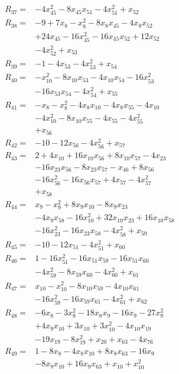 \begin{align*}
R_{37}={}&-4x_{45}^{2} -8x_{45}x_{51} -4x_{51}^{2} +x_{52}\\[3pt]
R_{38}={}&-9 +7x_{8} -x_{8}^{2} -8x_{8}x_{45} -4x_{8}x_{52}\\
&+24x_{45} -16x_{45}^{2} -16x_{45}x_{52} +12x_{52}\\
&-4x_{52}^{2} +x_{53}\\[3pt]
R_{39}={}&-1 -4x_{53} -4x_{53}^{2} +x_{54}\\[3pt]
R_{40}={}&-x_{10}^{2} -8x_{10}x_{53} -4x_{10}x_{54} -16x_{53}^{2}\\
&-16x_{53}x_{54} -4x_{54}^{2} +x_{55}\\[3pt]
R_{41}={}&-x_{8} -x_{8}^{2} -4x_{8}x_{10} -4x_{8}x_{55} -4x_{10}\\
&-4x_{10}^{2} -8x_{10}x_{55} -4x_{55} -4x_{55}^{2}\\
&+x_{56}\\[3pt]
R_{42}={}&-10 -12x_{56} -4x_{56}^{2} +x_{57}\\[3pt]
R_{43}={}&2 +4x_{10} +16x_{10}x_{56} +8x_{10}x_{57} -4x_{23}\\
&-16x_{23}x_{56} -8x_{23}x_{57} -x_{46} +8x_{56}\\
&-16x_{56}^{2} -16x_{56}x_{57} +4x_{57} -4x_{57}^{2}\\
&+x_{58}\\[3pt]
R_{44}={}&x_{9} -x_{9}^{2} +8x_{9}x_{10} -8x_{9}x_{23}\\
&-4x_{9}x_{58} -16x_{10}^{2} +32x_{10}x_{23} +16x_{10}x_{58}\\
&-16x_{23}^{2} -16x_{23}x_{58} -4x_{58}^{2} +x_{59}\\[3pt]
R_{45}={}&-10 -12x_{51} -4x_{51}^{2} +x_{60}\\[3pt]
R_{46}={}&1 -16x_{51}^{2} -16x_{51}x_{59} -16x_{51}x_{60}\\
&-4x_{59}^{2} -8x_{59}x_{60} -4x_{60}^{2} +x_{61}\\[3pt]
R_{47}={}&x_{10} -x_{10}^{2} -8x_{10}x_{59} -4x_{10}x_{61}\\
&-16x_{59}^{2} -16x_{59}x_{61} -4x_{61}^{2} +x_{62}\\[3pt]
R_{48}={}&-6x_{8} -3x_{8}^{2} -18x_{8}x_{9} -16x_{9} -27x_{9}^{2}\\
&+4x_{9}x_{10} +3x_{10} +3x_{10}^{2} -4x_{10}x_{19}\\
&-19x_{19} -8x_{19}^{2} +x_{20} +x_{63} -4x_{76}\\[3pt]
R_{49}={}&1 -8x_{8} -4x_{8}x_{10} +8x_{8}x_{63} -16x_{9}\\
&-8x_{9}x_{10} +16x_{9}x_{63} +x_{10} +x_{10}^{2}\\

\end{align*}
